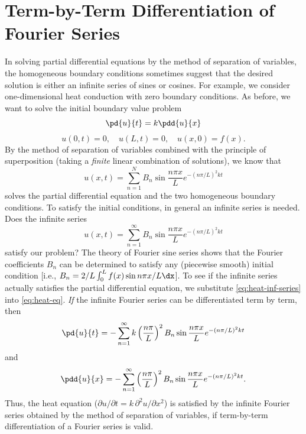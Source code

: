 \section{Term-by-Term Differentiation of Fourier Series}
\label{sec:term-diff}

In solving partial differential equations by the method of separation of variables, the homogeneous boundary conditions sometimes suggest that the desired solution is either an infinite series of sines or cosines.  For example, we consider one-dimensional heat conduction with zero boundary conditions.  As before, we want to solve the initial boundary value problem
\begin{equation}
\label{eq:heat-eq}
\pd{u}{t} = k \pdd{u}{x}
\end{equation}
\begin{equation}
\label{eq:heat-bc-ic}
u(0,t) = 0, \quad u(L,t) = 0, \quad u(x,0) = f(x).
\end{equation}
By the method of separation of variables combined with the principle of superposition (taking a \textit{finite} linear combination of solutions), we know that
\[
u(x,t) = \sum_{n=1}^{N} B_n \sin \frac{n\pi x}{L} e^{-(n\pi/L)^2 kt}
\]
solves the partial differential equation and the two homogeneous boundary conditions.  To satisfy the initial conditions, in general an infinite series is needed.  Does the infinite series
\begin{equation}
\label{eq:heat-inf-series}
u(x,t) = \sum_{n=1}^{\infty} B_n \sin \frac{n\pi x}{L} e^{-(n\pi/L)^2 kt}
\end{equation}
satisfy our problem?  The theory of Fourier sine series shows that the Fourier coefficients $B_n$ can be determined to satisfy any (piecewise smooth) initial condition [i.e., $B_n = 2/L \int_0^L f(x) \sin n\pi x/L \dx$].  To see if the infinite series actually satisfies the partial differential equation, we substitute \eqref{eq:heat-inf-series} into \eqref{eq:heat-eq}.  \textit{If} the infinite Fourier series can be differentiated term by term, then
\[
\pd{u}{t} = -\sum_{n=1}^{\infty} k\left(\frac{n\pi}{L}\right)^2 B_n \sin \frac{n\pi x}{L} e^{-(n\pi/L)^2 kt}
\]
and
\[
\pdd{u}{x} = -\sum_{n=1}^{\infty} \left(\frac{n\pi}{L}\right)^2 B_n \sin \frac{n\pi x}{L} e^{-(n\pi/L)^2 kt}.
\]
Thus, the heat equation ($\partial u/\partial t = k\,\partial^2 u/\partial x^2$) is satisfied by the infinite Fourier series obtained by the method of separation of variables, if term-by-term differentiation of a Fourier series is valid.

